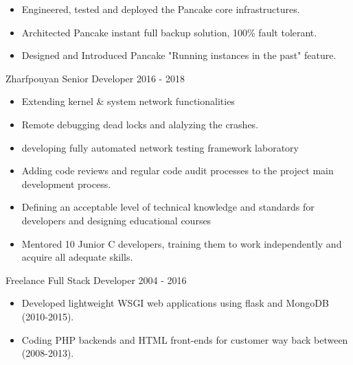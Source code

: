 \documentclass[12pt]{developercv}
\begin{document}
\begin{entrylist}
{			\begin{itemize}
				\itemsep0em
				\item Engineered, tested and deployed the Pancake core infrastructures.\\
				\item Architected Pancake instant full backup solution, 100\% fault tolerant.\\
				\item Designed and Introduced Pancake "Running instances in the past" feature.\\
			\end{itemize}
		}
	\entry
		{Zharfpouyan}
		{Senior Developer}
		{2016 - 2018}
		{
		\begin{itemize}
			\itemsep0em
			\item Extending kernel \& system network functionalities
			\item Remote debugging dead locks and alalyzing the crashes.
			\item developing fully automated network testing framework laboratory
			\item Adding code reviews and regular code audit processes to the project
			      main development process.
			\item Defining an acceptable level of technical knowledge and standards for
			      developers and designing educational courses
			\item Mentored 10 Junior C developers, training them to work independently and
			      acquire all adequate skills.
		\end{itemize}
		}
	\entry
		{Freelance}
		{Full Stack Developer}
		{2004 - 2016}
		{
			\begin{itemize}
				\itemsep0em
				\item Developed lightweight WSGI web applications using flask and MongoDB (2010-2015).
				\item Coding PHP backends and HTML front-ends for customer way back between (2008-2013).

\end{itemize}}
\end{entrylist}
\end{document}
